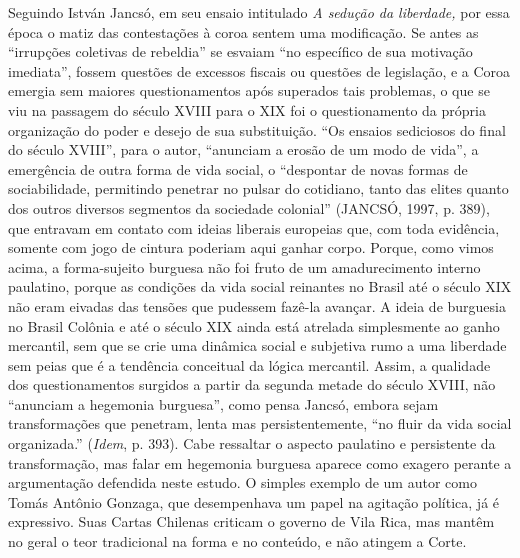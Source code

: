Seguindo István Jancsó, em seu ensaio intitulado \emph{A sedução da
liberdade,} por essa época o matiz das contestações à coroa sentem uma
modificação. Se antes as ``irrupções coletivas de rebeldia'' se esvaiam
``no específico de sua motivação imediata'', fossem questões de excessos
fiscais ou questões de legislação, e a Coroa emergia sem maiores
questionamentos após superados tais problemas, o que se viu na passagem
do século XVIII para o XIX foi o questionamento da própria organização
do poder e desejo de sua substituição. ``Os ensaios sediciosos do final
do século XVIII'', para o autor, ``anunciam a erosão de um modo de
vida'', a emergência de outra forma de vida social, o ``despontar de
novas formas de sociabilidade, permitindo penetrar no pulsar do
cotidiano, tanto das elites quanto dos outros diversos segmentos da
sociedade colonial'' (JANCSÓ, 1997, p. 389), que entravam em contato com
ideias liberais europeias que, com toda evidência, somente com jogo de
cintura poderiam aqui ganhar corpo. Porque, como vimos acima, a
forma-sujeito burguesa não foi fruto de um amadurecimento interno
paulatino, porque as condições da vida social reinantes no Brasil até o
século XIX não eram eivadas das tensões que pudessem fazê-la avançar. A
ideia de burguesia no Brasil Colônia e até o século XIX ainda está
atrelada simplesmente ao ganho mercantil, sem que se crie uma dinâmica
social e subjetiva rumo a uma liberdade sem peias que é a tendência
conceitual da lógica mercantil. Assim, a qualidade dos questionamentos
surgidos a partir da segunda metade do século XVIII, não ``anunciam a
hegemonia burguesa'', como pensa Jancsó, embora sejam transformações que
penetram, lenta mas persistentemente, ``no fluir da vida social
organizada.'' (\emph{Idem}, p. 393). Cabe ressaltar o aspecto paulatino
e persistente da transformação, mas falar em hegemonia burguesa aparece
como exagero perante a argumentação defendida neste estudo. O simples
exemplo de um autor como Tomás Antônio Gonzaga, que desempenhava um
papel na agitação política, já é expressivo. Suas Cartas Chilenas
criticam o governo de Vila Rica, mas mantêm no geral o teor tradicional
na forma e no conteúdo, e não atingem a Corte.

